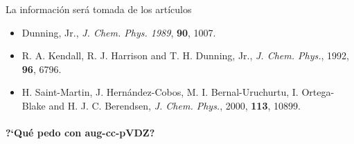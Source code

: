 La información será tomada de los artículos
\begin{itemize}
 \item Dunning, Jr., {\it J. Chem. Phys. 1989}, {\bf 90}, 1007.
 \item R. A. Kendall, R. J. Harrison and T. H. Dunning, Jr., {\it J.
 Chem. Phys.}, 1992, {\bf 96}, 6796.
 \item H. Saint-Martin, J. Hernández-Cobos, M. I. Bernal-Uruchurtu,
 I. Ortega-Blake and H. J. C. Berendsen, {\it J. Chem. Phys.}, 2000,
 {\bf 113}, 10899.
\end{itemize}
\paragraph{?`Qué pedo con aug-cc-pVDZ?}
